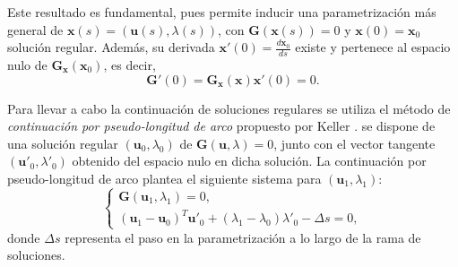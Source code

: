 Este resultado es fundamental, pues permite inducir una parametrización más general
de $ \mathbf{x}(s) = ( \mathbf{u}(s), \lambda(s)) $, con
$ \mathbf{G}(\mathbf{x}(s)) = 0 $ y $\mathbf{x}(0) = \mathbf{x}_0$ solución regular.
Además, su derivada $\mathbf{x}' (0) = \tfrac{d\mathbf{x}_0}{ds}$
existe y pertenece al espacio nulo de $ \mathbf{G}_{\mathbf{x}}(\mathbf{x}_0)$, es decir,
\begin{equation}
    \mathbf{G}'(0) = \mathbf{G}_{\mathbf{x}}(\mathbf{x}) \mathbf{x}'(0) = 0.
    \label{eq:tangent_direction}
\end{equation}

Para llevar a cabo la continuación de soluciones regulares se utiliza el método de
\emph{continuación por pseudo-longitud de arco} propuesto por Keller \cite{Keller1977}.
 se dispone de una solución regular $(\mathbf{u}_0, \lambda_0)$ de
$\mathbf{G}(\mathbf{u}, \lambda) = 0$, junto con el vector tangente
$(\mathbf{u}'_0, \lambda'_0)$ obtenido del espacio nulo en dicha solución.
La continuación por pseudo-longitud de arco plantea el siguiente sistema para
$(\mathbf{u}_1, \lambda_1)$:
\begin{equation}
    \begin{cases}
        \mathbf{G}(\mathbf{u}_1, \lambda_1) = 0, \\
        (\mathbf{u}_1 - \mathbf{u}_0)^T \mathbf{u}'_0 +
        (\lambda_1 - \lambda_0) \lambda'_0
        - \Delta s = 0,
    \end{cases}
    \label{eq:System_PALC}
\end{equation}
donde $\Delta s$ representa el paso en la parametrización a lo largo de la rama de soluciones.


